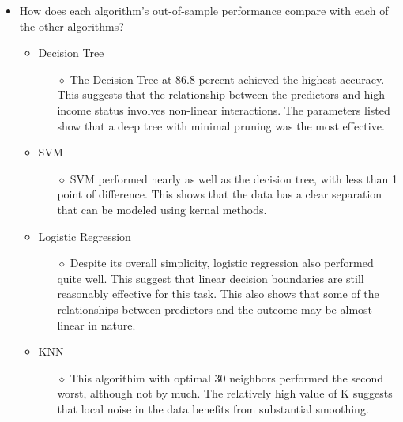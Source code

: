 \documentclass[12pt,letterpaper]{article}
\begin{document}
    \begin{itemize}
        \item How does each algorithm’s out-of-sample performance compare with each of the other algorithms?
         \begin{itemize}
            \item Decision Tree
            \begin{itemize}
                \item[$\diamond$] The Decision Tree at 86.8 percent achieved the highest accuracy. This suggests that the relationship between the predictors and high-income status involves non-linear interactions. The parameters listed show that a deep tree with minimal pruning was the most effective. 
            \end{itemize}
          \end{itemize}
          \begin{itemize}
            \item SVM
            \begin{itemize}
                \item[$\diamond$] SVM performed nearly as well as the decision tree, with less than 1 point of difference. This shows that the data has a clear separation that can be modeled using kernal methods. 
            \end{itemize}
          \end{itemize}
          \begin{itemize}
            \item Logistic Regression
            \begin{itemize}
                \item[$\diamond$] Despite its overall simplicity, logistic regression also performed quite well. This suggest that linear decision boundaries are still reasonably effective for this task. This also shows that some of the relationships between predictors and the outcome may be almost linear in nature. 
            \end{itemize}
          \end{itemize}
          \newpage
          \begin{itemize}
            \item KNN
            \begin{itemize}
                \item[$\diamond$] This algorithim with optimal 30 neighbors performed the second worst, although not by much. The relatively high value of K suggests that local noise in the data benefits from substantial smoothing. 

\end{itemize}
\end{itemize}
\end{itemize}
\end{document}
